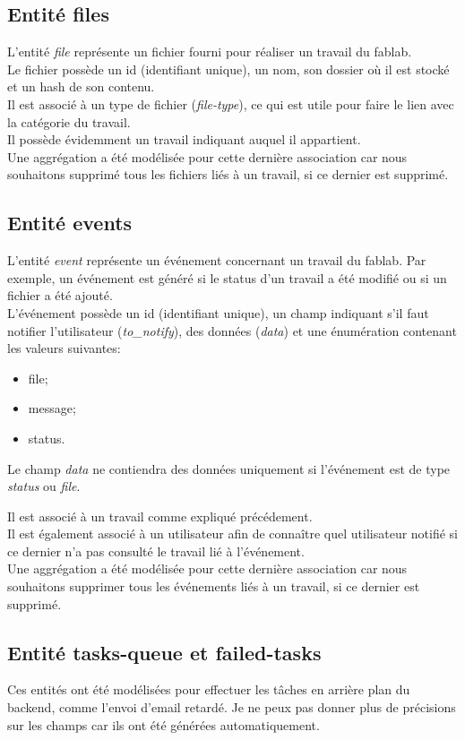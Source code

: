 \documentclass[
    iai, %
    il, %
]{heig-tb}
\begin{document}
\subsection{Entité files}
L'entité \emph{file} représente un fichier fourni pour réaliser un travail du \Gls{fablab}.\\
Le fichier possède un id (identifiant unique), un nom, son dossier où il est stocké et un hash de son contenu.\\
Il est associé à un type de fichier (\emph{file-type}), ce qui est utile pour faire le lien avec la catégorie du travail.\\
Il possède évidemment un travail indiquant auquel il appartient.\\
Une aggrégation a été modélisée pour cette dernière association car nous souhaitons supprimé tous les fichiers liés à un travail, si ce dernier est supprimé.

\subsection{Entité events}
L'entité \emph{event} représente un événement concernant un travail du \Gls{fablab}. Par exemple, un événement est généré si le status d'un travail a été modifié ou si un fichier a été ajouté. \\
L'événement possède un id (identifiant unique), un champ indiquant s'il faut notifier l'utilisateur (\emph{to\_notify}), des données (\emph{data}) et une énumération contenant les valeurs suivantes:

\begin{itemize}
    \item file;
    \item message;
    \item status.
\end{itemize}

Le champ \emph{data} ne contiendra des données uniquement si l'événement est de type \emph{status} ou \emph{file}.

Il est associé à un travail comme expliqué précédement.\\
Il est également associé à un utilisateur afin de connaître quel utilisateur notifié si ce dernier n'a pas consulté le travail lié à l'événement.\\
Une aggrégation a été modélisée pour cette dernière association car nous souhaitons supprimer tous les événements liés à un travail, si ce dernier est supprimé.

\subsection{Entité tasks-queue et failed-tasks}
Ces entités ont été modélisées pour effectuer les tâches en arrière plan du \Gls{backend}, comme l'envoi d'email retardé. Je ne peux pas donner plus de précisions sur les champs car ils ont été générées automatiquement.
\end{document}
